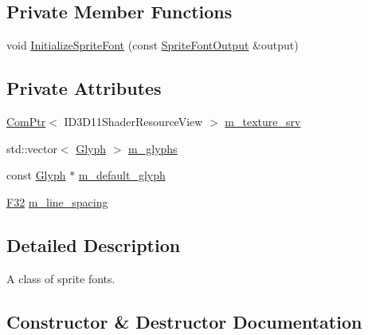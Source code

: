 \subsection*{Private Member Functions}
\begin{DoxyCompactItemize}
\item 
void \mbox{\hyperlink{classmage_1_1rendering_1_1_sprite_font_a832f140b987c30ef8f6a3b95afe52711}{Initialize\+Sprite\+Font}} (const \mbox{\hyperlink{structmage_1_1rendering_1_1_sprite_font_output}{Sprite\+Font\+Output}} \&output)
\end{DoxyCompactItemize}
\subsection*{Private Attributes}
\begin{DoxyCompactItemize}
\item 
\mbox{\hyperlink{namespacemage_ae74f374780900893caa5555d1031fd79}{Com\+Ptr}}$<$ I\+D3\+D11\+Shader\+Resource\+View $>$ \mbox{\hyperlink{classmage_1_1rendering_1_1_sprite_font_acdd3ca40befd9508a20011769046256e}{m\+\_\+texture\+\_\+srv}}
\item 
std\+::vector$<$ \mbox{\hyperlink{structmage_1_1rendering_1_1_glyph}{Glyph}} $>$ \mbox{\hyperlink{classmage_1_1rendering_1_1_sprite_font_aba69731bf4701ab790b1575515de22b9}{m\+\_\+glyphs}}
\item 
const \mbox{\hyperlink{structmage_1_1rendering_1_1_glyph}{Glyph}} $\ast$ \mbox{\hyperlink{classmage_1_1rendering_1_1_sprite_font_a0d60c46888b2b2a2c1787dcf6f0e041b}{m\+\_\+default\+\_\+glyph}}
\item 
\mbox{\hyperlink{namespacemage_aa97e833b45f06d60a0a9c4fc22ae02c0}{F32}} \mbox{\hyperlink{classmage_1_1rendering_1_1_sprite_font_acc3c1cefce72befc5c16db5ec39dd61f}{m\+\_\+line\+\_\+spacing}}
\end{DoxyCompactItemize}


\subsection{Detailed Description}
A class of sprite fonts. 

\subsection{Constructor \& Destructor Documentation}
\mbox{\label{classmage_1_1rendering_1_1_sprite_font_a6080794a32e8e4fa4b2be7392a4e9466}} 
